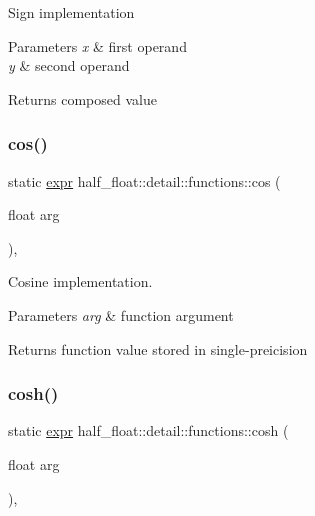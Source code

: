 Sign implementation 
\begin{DoxyParams}{Parameters}
{\em x} & first operand \\
\hline
{\em y} & second operand \\
\hline
\end{DoxyParams}
\begin{DoxyReturn}{Returns}
composed value 
\end{DoxyReturn}
\mbox{\label{structhalf__float_1_1detail_1_1functions_ab300defee608b0fa52aca095babd495c}} 
\subsubsection{\texorpdfstring{cos()}{cos()}}
{\footnotesize\ttfamily static \hyperlink{structhalf__float_1_1detail_1_1expr}{expr} half\+\_\+float\+::detail\+::functions\+::cos (\begin{DoxyParamCaption}\item[{float}]{arg }\end{DoxyParamCaption})\hspace{0.3cm}{\ttfamily [inline]}, {\ttfamily [static]}}

Cosine implementation. 
\begin{DoxyParams}{Parameters}
{\em arg} & function argument \\
\hline
\end{DoxyParams}
\begin{DoxyReturn}{Returns}
function value stored in single-\/preicision 
\end{DoxyReturn}
\mbox{\label{structhalf__float_1_1detail_1_1functions_a662fccaf35128b6a0349f52f04ec8625}} 
\subsubsection{\texorpdfstring{cosh()}{cosh()}}
{\footnotesize\ttfamily static \hyperlink{structhalf__float_1_1detail_1_1expr}{expr} half\+\_\+float\+::detail\+::functions\+::cosh (\begin{DoxyParamCaption}\item[{float}]{arg }\end{DoxyParamCaption})\hspace{0.3cm}{\ttfamily [inline]}, {\ttfamily [static]}}

